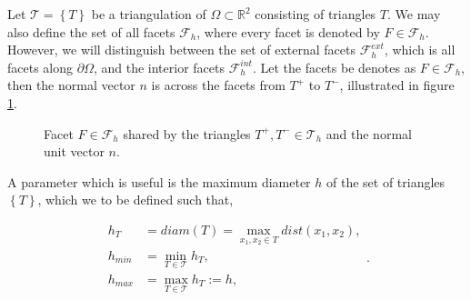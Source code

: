Let $\mathcal{T}  = \left\{ T \right\} $ be a triangulation of $\Omega \subset   \mathbb{R} ^2 $ consisting of triangles $T$. We may also define the set of all facets $\mathcal{F}_{h}$, where every facet is denoted by $F \in \mathcal{F} _{h}$. However, we will distinguish between the
set of external facets $\mathcal{F}^{ext} _{h}$, which is all facets along $\partial \Omega $, and the interior facets $\mathcal{F} ^{int}_{h}$. Let the facets be denotes as $F \in \mathcal{F } _{h}$, then the normal vector $n$ is across the facets from
$T^{+}$ to $T^{-}$, illustrated in figure \ref{fig:normal}.

\begin{figure}[!h]
\centering
{}
\caption{Facet $F \in \mathcal{F}_h $ shared by the triangles $T^{+}, T^{-} \in \mathcal{T}_{h} $ and the normal unit vector $n$.  }
    \label{fig:normal}
\end{figure}

A parameter which is useful is the maximum diameter $h$ of the set of triangles $\left\{ T \right\} $, which we to be defined such that,

\begin{equation}
\begin{split}
    h _{T} & = diam\left( T \right)   = \max_{x_1, x_{2} \in T} dist(x_{1}, x_{2}),  \\
    h_{min} & = \min_{T \in \mathcal{T} } h_{T}, \\
    h_{max} &= \max_{T \in \mathcal{T} }  h_{T} := h,
\end{split}
.\end{equation}




